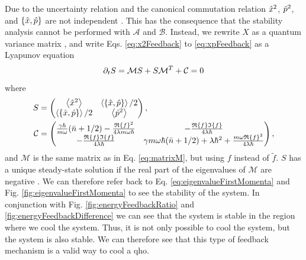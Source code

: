 Due to the uncertainty relation and the canonical commutation relation $\hat{x}^2$, $\hat{p}^2$, and $\acomm{\xop}{\pop}$ are not independent \cite{Simon:1994}. This has the consequence that the stability analysis cannot be performed with $\mathcal{A}$ and $\mathcal{B}$. Instead, we rewrite $X$ as a quantum variance matrix \cite{Simon:1994}, and write Eqs. \eqref{eq:x2Feedback} to \eqref{eq:xpFeedback} as a Lyapunov equation
\begin{equation}
    \partial_t S = \mathcal{M} S + S \mathcal{M}^T  + \mathcal{C} = 0
\end{equation}
where 
\begin{align}
    S &= 
    \begin{pmatrix}
    \expval{\xop^2} & \expval{\acomm{\xop}{\pop}}/2\\
    \expval{\acomm{\xop}{\pop}}/2 & \expval{\pop^2}    
    \end{pmatrix},
    \\
    \mathcal{C} &=
    \begin{pmatrix}
        \frac{\gamma \hbar}{m \omega} (\nbar + 1/2) - \frac{\re{f}^2}{4\lambda m \omega \hbar} & -\frac{\re{f} \im{f}}{4 \lambda \hbar}\\
        -\frac{\re{f} \im{f}}{4 \lambda \hbar} & \gamma m \omega \hbar (\nbar + 1/2) + \lambda \hbar^2 +\frac{m \omega \re{f}^2}{4 \lambda \hbar}
    \end{pmatrix},
\end{align}
and $\mathcal{M}$ is the same matrix as in Eq. \eqref{eq:matrixM}, but using $f$ instead of $\tilde{f}$. $S$ has a unique steady-state solution if the real part of the eigenvalues of $\mathcal{M}$ are negative \cite{Purkayastha:2022}. We can therefore refer back to Eq. \eqref{eq:eigenvalueFirstMomenta} and Fig. \ref{fig:eigenvalueFirstMomenta} to see the stability of the system. In conjunction with Fig. \ref{fig:energyFeedbackRatio} and \ref{fig:energyFeedbackDifference} we can see that the system is stable in the region where we cool the system. Thus, it is not only possible to cool the system, but the system is also stable. We can therefore see that this type of feedback mechanism is a valid way to cool a \gls{qho}.